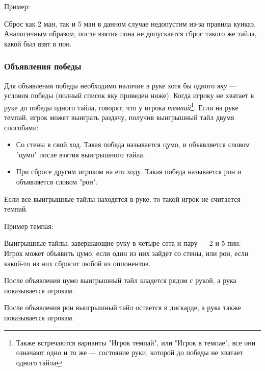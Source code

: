 \begin{additional}

Пример:

 \hfill {}

Сброс как 2 ман, так и 5 ман в данном случае недопустим из-за правила куикаэ. Аналогичным образом, после взятия пона не допускается сброс такого же тайла, какой был взят в пон.

\end{additional}

\subsubsection{Объявления победы}

Для объявления победы необходимо наличие в руке хотя бы одного \textit{яку} --- условия победы (полный список яку приведен ниже).
Когда игроку не хватает в руке до победы одного тайла, говорят, что у игрока \textit{темпай}\footnote{Также встречаются варианты "Игрок темпай", или "Игрок в темпае", все они означают одно и то же --- состояние руки, которой до победы не хватает одного тайла}. Если на руке темпай, игрок может выиграть раздачу, получив выигрышный тайл двумя способами:

\begin{itemize}
	\item Со стены в свой ход. Такая победа называется цумо, и объявляется словом "цумо" после взятия выигрышного тайла.
	\item При сбросе другим игроком на его ходу. Такая победа называется рон и объявляется словом "рон".
\end{itemize}

Если все выигрышные тайлы находятся в руке, то такой игрок не считается темпай.

\begin{additional}


Пример темпая:

 \hfill {}

Выигрышные тайлы, завершающие руку в четыре сета и пару --- 2 и 5 пин. Игрок может объявить цумо, если один из них зайдет со стены, или рон, если какой-то из них сбросит любой из оппонентов. 
\end{additional}

После объявления цумо выигрышный тайл кладется рядом с рукой, а рука показывается игрокам. 

После объявления рон выигрышный тайл остается в дискарде, а рука также показывается игрокам.

